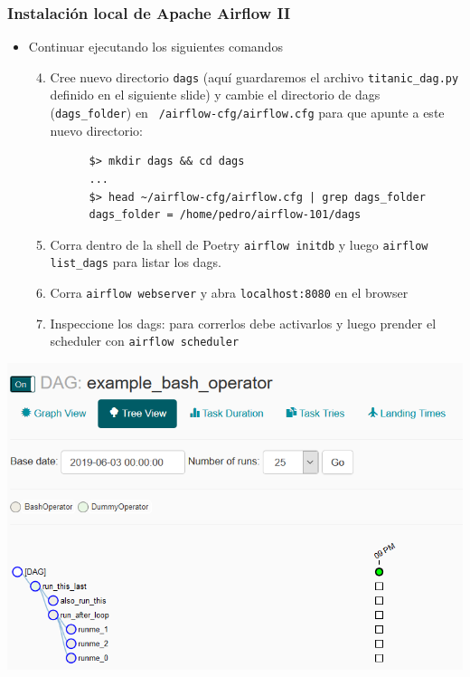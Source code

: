 \documentclass[leqno, 10pt, envcountsect]{beamer}
\numberwithin{equation}{section}
\theoremstyle{definition}
\theoremstyle{example}
\numberwithin{figure}{section}
\numberwithin{table}{section}
\let\olditem\item
\renewcommand{\item}{%
\olditem\vspace{1pt}}
\begin{document}
\begin{frame}[fragile=singleslide]
  \frametitle{Instalación local de Apache Airflow II}
  \begin{itemize}
    \item Continuar ejecutando los siguientes comandos
    \begin{enumerate}
      \setcounter{enumi}{3}
      \item Cree
        nuevo directorio \texttt{dags} (aquí guardaremos el archivo
        \texttt{titanic_dag.py} definido en el siguiente slide) y cambie el directorio de dags
        (\texttt{dags_folder}) en
        \texttt{~/airflow-cfg/airflow.cfg} para que apunte a este nuevo
        directorio:
      \begin{verbatim}
      $> mkdir dags && cd dags
      ...
      $> head ~/airflow-cfg/airflow.cfg | grep dags_folder
      dags_folder = /home/pedro/airflow-101/dags
      \end{verbatim}
    \item Corra dentro de la shell de Poetry \texttt{airflow initdb} y luego \texttt{airflow list_dags}
      para listar los dags.
    \item Corra \texttt{airflow webserver} y abra \texttt{localhost:8080} en
      el browser
    \item Inspeccione los dags: para correrlos debe activarlos y luego
      prender el scheduler con \texttt{airflow scheduler}
    \end{enumerate}
  \end{itemize}
  \begin{center}
    \includegraphics[scale=0.2]{example_bash_operator.png}
  \end{center}
\end{frame}
\end{document}

